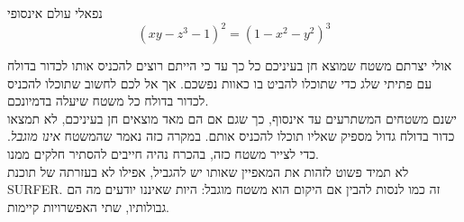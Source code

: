 \begin{surferPage}{נפאלי}
עולם אינסופי \\

\smallskip
\[(x y - z^3 -1)^2= (1 - x^2	- y^2)^3\]

\singlespacing
אולי יצרתם משטח שמוצא חן בעיניכם כל כך עד כי הייתם רוצים להכניס אותו לכדור בדולח עם פתיתי שלג כדי שתוכלו להביט בו כאוות נפשכם. אך אל לכם לחשוב שתוכלו להכניס לכדור בדולח כל משטח שיעלה בדמיונכם.
\\
\singlespacing
ישנם משטחים המשתרעים עד אינסוף, כך שגם אם הם מאד מוצאים חן בעיניכם, לא תמצאו כדור בדולח גדול מספיק שאליו תוכלו להכניס אותם. במקרה כזה נאמר שהמשטח \textit{אינו מוגבל}. כדי לצייר משטח כזה, בהכרח נהיה חייבים להסתיר חלקים ממנו.
\\
\singlespacing
לא תמיד פשוט לזהות את המאפיין שאותו יש להגביל, אפילו לא בעזרתה של תוכנת SURFER. זה כמו לנסות להבין אם היקום הוא משטח מוגבל: היות שאיננו יודעים מה הם גבולותיו, שתי האפשרויות קיימות.
\end{surferPage}
